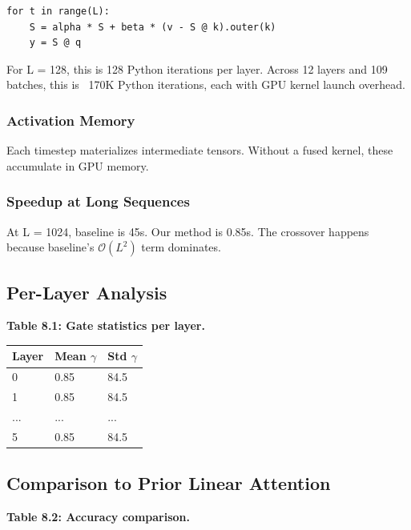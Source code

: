 \begin{lstlisting}
for t in range(L):
    S = alpha * S + beta * (v - S @ k).outer(k)
    y = S @ q
\end{lstlisting}

For L = 128, this is 128 Python iterations per layer. Across 12 layers and 
109 batches, this is ~170K Python iterations, each with GPU kernel launch 
overhead.

\subsubsection{Activation Memory}

Each timestep materializes intermediate tensors. Without a fused kernel, 
these accumulate in GPU memory.

\subsubsection{Speedup at Long Sequences}

At L = 1024, baseline is 45s. Our method is 0.85s. The crossover 
happens because baseline's $\mathcal{O}(L^2)$ term dominates.

\subsection{Per-Layer Analysis}

\textbf{Table 8.1: Gate statistics per layer.}

\begin{table}[H]
\centering
\small
\begin{tabular}{lll}
\toprule
\textbf{Layer} & \textbf{Mean $\gamma$} & \textbf{Std $\gamma$} \\
\midrule
0 & 0.85 & 84.5 \\
1 & 0.85 & 84.5 \\
... & ... & ... \\
5 & 0.85 & 84.5 \\
\bottomrule
\end{tabular}
\end{table}

\subsection{Comparison to Prior Linear Attention}

\textbf{Table 8.2: Accuracy comparison.}

